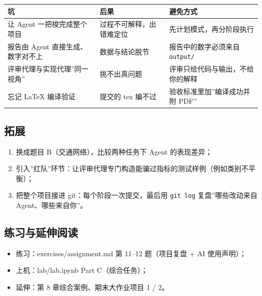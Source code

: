 {\def\LTcaptype{none} %
\begin{longtable}[]{@{}
  >{\raggedright\arraybackslash}p{}
  >{\raggedright\arraybackslash}p{}
  >{\raggedright\arraybackslash}p{}@{}}
\toprule\noalign{}
\begin{minipage}[b]{\linewidth}\raggedright
坑
\end{minipage} & \begin{minipage}[b]{\linewidth}\raggedright
后果
\end{minipage} & \begin{minipage}[b]{\linewidth}\raggedright
避免方式
\end{minipage} \\
\midrule\noalign{}
\endhead
\bottomrule\noalign{}
\endlastfoot
让 Agent 一把梭完成整个项目 & 过程不可解释，出错难定位 &
先计划模式，再分阶段执行 \\
报告由 Agent 直接生成、数字对不上 & 数据与结论脱节 &
报告中的数字必须来自 \texttt{output/} \\
评审代理与实现代理''同一视角'' & 挑不出真问题 &
评审只给代码与输出，不给你的解释 \\
忘记 LaTeX 编译验证 & 提交的 tex 编不过 & 验收标准里加''编译成功并附
PDF'' \\
\end{longtable}
}

\subsection{拓展}\label{ux62d3ux5c55-14}

\begin{enumerate}
\def\labelenumi{\arabic{enumi}.}
\tightlist
\item
  换成题目 B（交通网络），比较两种任务下 Agent 的表现差异；
\item
  引入''红队''环节：让评审代理专门构造能骗过指标的测试样例（例如类别不平衡）；
\item
  把整个项目接进 git：每个阶段一次提交，最后用 \texttt{git\ log}
  复盘''哪些改动来自 Agent、哪些来自你''。
\end{enumerate}

\subsection{练习与延伸阅读}\label{ux7ec3ux4e60ux4e0eux5ef6ux4f38ux9605ux8bfb-6}

\begin{itemize}
\tightlist
\item
  练习：exercises/assignment.md 第 11--12 题（项目复盘 + AI 使用声明）；
\item
  上机：lab/lab.ipynb Part C（综合任务）；
\item
  延伸：第 8 章综合案例、期末大作业项目 1 / 2。
\end{itemize}

\newpage
